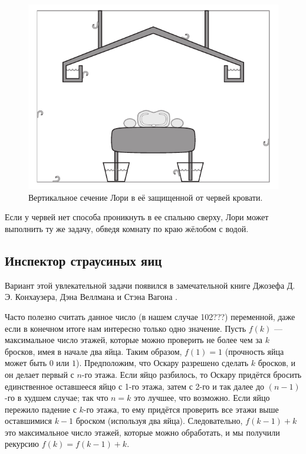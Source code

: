 \begin{figure}[h!]
\centering
\includegraphics[scale=0.5]{pics/chervi}
\caption{Вертикальное сечение Лори в её защищенной от червей кровати.}
\end{figure}

Если у червей нет способа проникнуть в ее спальню сверху, Лори может выполнить ту же задачу, обведя комнату по краю жёлобом с водой.

\subsection*{Инспектор страусиных яиц}

Вариант этой увлекательной задачи появился в замечательной книге Джозефа Д. Э. Конхаузера, Дэна Веллмана и Стэна Вагона \cite{}.

Часто полезно считать данное число (в нашем случае 102???) переменной, даже если в конечном итоге нам интересно только одно значение.
Пусть $f(k)$ --- максимальное число этажей, которые можно проверить не более чем за $k$ бросков, имея в начале два яйца.
Таким образом, $f(1) = 1$ (прочность яйца может быть $0$ или $1$).
Предположим, что Оскару разрешено сделать $k$ бросков, и он делает первый с $n$-го этажа.
Если яйцо разбилось, то Оскару придётся бросить единственное оставшееся яйцо с 1-го этажа, затем с 2-го и так далее до $(n-1)$-го в худшем случае;
так что $n = k$ это лучшее, что возможно.
Если яйцо пережило падение с $k$-го этажа, то ему придётся проверить все этажи выше оставшимися $k-1$ броском (используя два яйца).
Следовательно, $f(k - 1) + k$ это максимальное число этажей, которые можно обработать,
и мы получили рекурсию $f(k) = f(k - 1) + k$.

